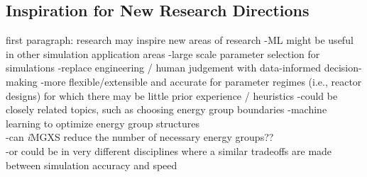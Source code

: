 \subsection{Inspiration for New Research Directions}
\label{subsec:chap12-inspiration}


first paragraph: research may inspire new areas of research
-ML might be useful in other simulation application areas
  -large scale parameter selection for simulations
  -replace engineering / human judgement with data-informed decision-making
    -more flexible/extensible and accurate for parameter regimes (i.e., reactor designs) for which there may be little prior experience / heuristics
-could be closely related topics, such as choosing energy group boundaries
  -machine learning to optimize energy group structures \\
    -can \textit{i}MGXS reduce the number of necessary energy groups?? \\
-or could be in very different disciplines where a similar tradeoffs are made between simulation accuracy and speed